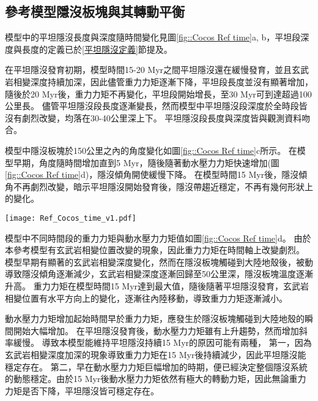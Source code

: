 \newpage
\subsection{參考模型隱沒板塊與其轉動平衡}
模型中的平坦隱沒長度與深度隨時間變化見圖\ref{fig::Cocos Ref time}a, b，平坦段深度與長度的定義已於\ref{平坦隱沒定義}節提及。

在平坦隱沒發育初期，模型時間15-20 Myr之間平坦隱沒還在緩慢發育，並且玄武岩相變深度持續加深，因此儘管重力力矩逐漸下降，平坦段長度並沒有顯著增加，隨後於20 Myr後，重力力矩不再變化，平坦段開始增長，至30 Myr可到達超過100公里長。
儘管平坦隱沒段長度逐漸變長，然而模型中平坦隱沒段深度於全時段皆沒有劇烈改變，均落在30-40公里深上下。
平坦隱沒段長度與深度皆與觀測資料吻合。

模型中隱沒板塊於150公里之內的角度變化如圖\ref{fig::Cocos Ref time}c所示。
在模型早期，角度隨時間增加直到5 Myr，隨後隨著動水壓力力矩快速增加(圖\ref{fig::Cocos Ref time}d)，隱沒傾角開使緩慢下降。
在模型時間15 Myr後，隱沒傾角不再劇烈改變，暗示平坦隱沒開始發育後，隱沒帶趨近穩定，不再有幾何形狀上的變化。

\begin{figure*}[hb]
    \centering
    \texttt{[image: Ref\_Cocos\_time\_v1.pdf]}
    \caption[墨西哥參考模型隱沒板塊狀態隨時間變化]{墨西哥參考模型隱沒板塊狀態隨時間變化。紫色虛線為模型中平坦隱沒發育成形之開始時間。(a)模型中平坦段長度隨時間變化，其中}
    \label{fig::Cocos Ref time}
\end{figure*}

模型中不同時間段的重力力矩與動水壓力力矩值如圖\ref{fig::Cocos Ref time}d。
由於本參考模型有玄武岩相變位置改變的現象，因此重力力矩在時間軸上改變劇烈。
模型早期有顯著的玄武岩相變深度變化，然而在隱沒板塊觸碰到大陸地殼後，被動導致隱沒傾角逐漸減少，玄武岩相變深度逐漸回歸至50公里深，隱沒板塊溫度逐漸升高。
重力力矩在模型時間15 Myr達到最大值，隨後隨著平坦隱沒發育，玄武岩相變位置有水平方向上的變化，逐漸往內陸移動，導致重力力矩逐漸減小。

動水壓力力矩增加起始時間早於重力力矩，應發生於隱沒板塊觸碰到大陸地殼的瞬間開始大幅增加。
在平坦隱沒發育後，動水壓力力矩雖有上升趨勢，然而增加斜率緩慢。
導致本模型能維持平坦隱沒持續15 Myr的原因可能有兩種，
第一，因為玄武岩相變深度加深的現象導致重力力矩在15 Myr後持續減少，因此平坦隱沒能穩定存在。
第二，早在動水壓力力矩巨幅增加的時期，便已經決定整個隱沒系統的動態穩定。由於15 Myr後動水壓力力矩依然有極大的轉動力矩，因此無論重力力矩是否下降，平坦隱沒皆可穩定存在。